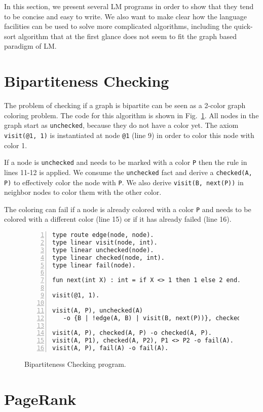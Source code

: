 
In this section, we present several LM programs in order to show that they tend to be concise and
easy to write. We also want to make clear how the language facilities can be used to solve more
complicated algorithms, including the quick-sort algorithm that at the first glance does not seem
to fit the graph based paradigm of LM.

\section{Bipartiteness Checking}

The problem of checking if a graph is bipartite can be seen as a 2-color graph coloring problem.
The code for this algorithm is shown in Fig.~\ref{code:bichecking}. All nodes in the graph
start as \texttt{unchecked}, because they do not have a color yet. The axiom \texttt{visit(@1, 1)} is
instantiated at node \texttt{@1} (line 9) in order to color this node with color 1.

If a node is \texttt{unchecked} and needs to be marked with a color \texttt{P} then the rule in
lines 11-12 is applied. We consume the \texttt{unchecked} fact and derive a \texttt{checked(A, P)}
to effectively color the node with \texttt{P}. We also derive \texttt{visit(B, next(P))} in
neighbor nodes to color them with the other color.

The coloring can fail if a node is already colored with a color \texttt{P} and needs to be colored
with a different color (line 15) or if it has already failed (line 16).

\begin{figure}[h!]
\small\begin{Verbatim}[numbers=left]
type route edge(node, node).
type linear visit(node, int).
type linear unchecked(node).
type linear checked(node, int).
type linear fail(node).

fun next(int X) : int = if X <> 1 then 1 else 2 end.

visit(@1, 1).

visit(A, P), unchecked(A)
   -o {B | !edge(A, B) | visit(B, next(P))}, checked(A, P).

visit(A, P), checked(A, P) -o checked(A, P).
visit(A, P1), checked(A, P2), P1 <> P2 -o fail(A).
visit(A, P), fail(A) -o fail(A).
\end{Verbatim}
  \caption{Bipartiteness Checking program.}
  \label{code:bichecking}
\end{figure}
\normalsize

\section{PageRank}

